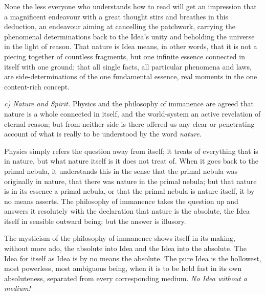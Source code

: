 \documentclass[12pt,a4paper]{book}
\newcommand{\runin}[1]{\emph{#1}\hspace{0.4em}}
\begin{document}
None the less everyone who understands how to read will get an impression that a magnificent endeavour with a
great thought stirs and breathes in this deduction, an endeavour aiming at cancelling the patchwork, carrying
the phenomenal determinations back to the Idea's unity and beholding the universe in the light of reason. That
nature is Idea means, in other words, that it is not a piecing together of countless fragments, but one
infinite essence connected in itself with one ground; that all single facts, all particular phenomena and
laws, are side-determinations
of the one fundamental essence, real moments in the one content-rich concept.

\runin{c) Nature and Spirit.} Physics and the philosophy of immanence are agreed that nature is a whole
connected in itself, and the world-system an active revelation of eternal reason; but from neither side is
there offered us any clear or penetrating account of what is really to be understood by the word
\emph{nature}.

Physics simply refers the question away from itself; it treats of everything that is in nature, but what
nature itself is it does not treat of. When it goes back to the primal nebula, it understands this in the
sense that the primal nebula was originally in nature, that there was nature in the primal nebula; but that
nature is in its essence a primal nebula, or that the primal nebula is nature itself, it by no means asserts.
The philosophy of immanence takes the question up and answers it resolutely with the declaration that nature
is the absolute, the Idea itself in sensible outward being; but the answer is illusory.

The mysticism of the philosophy of immanence shows itself in its making, without more ado, the absolute into
Idea and the Idea into the absolute. The Idea for itself as Idea is by no means the absolute. The pure Idea
is the hollowest, most powerless, most ambiguous being, when it is to be held fast in its own absoluteness,
separated from every corresponding medium. \emph{No Idea without a medium!}
\end{document}
